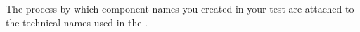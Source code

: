 \item[Object mapping]{
The process by which component names you created in your test are attached to the technical names used in the \gdaut{}.
}


